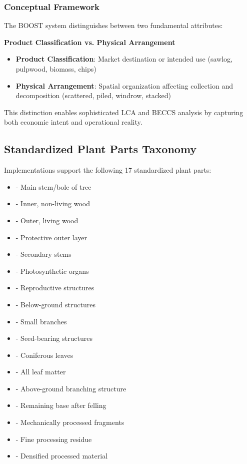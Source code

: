 \subsubsection{Conceptual Framework}

The BOOST system distinguishes between two fundamental attributes:

\textbf{Product Classification vs. Physical Arrangement}
\begin{itemize}
    \item \textbf{Product Classification}: Market destination or intended use (sawlog, pulpwood, biomass, chips)
    \item \textbf{Physical Arrangement}: Spatial organization affecting collection and decomposition (scattered, piled, windrow, stacked)
\end{itemize}

This distinction enables sophisticated LCA and BECCS analysis by capturing both economic intent and operational reality.

\subsection{Standardized Plant Parts Taxonomy}
\label{sec:plant-parts-taxonomy}

Implementations \MUST{} support the following 17 standardized plant parts:

\begin{itemize}
    \item \textbf{} - Main stem/bole of tree
    \item \textbf{} - Inner, non-living wood
    \item \textbf{} - Outer, living wood
    \item \textbf{} - Protective outer layer
    \item \textbf{} - Secondary stems
    \item \textbf{} - Photosynthetic organs
    \item \textbf{} - Reproductive structures
    \item \textbf{} - Below-ground structures
    \item \textbf{} - Small branches
    \item \textbf{} - Seed-bearing structures
    \item \textbf{} - Coniferous leaves
    \item \textbf{} - All leaf matter
    \item \textbf{} - Above-ground branching structure
    \item \textbf{} - Remaining base after felling
    \item \textbf{} - Mechanically processed fragments
    \item \textbf{} - Fine processing residue
    \item \textbf{} - Densified processed material
\end{itemize}

